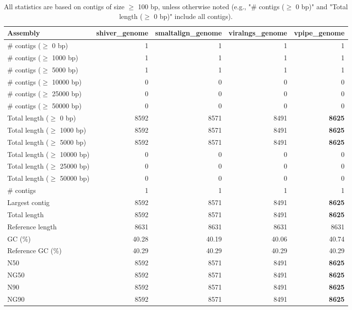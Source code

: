 \documentclass[12pt,a4paper]{article}
\begin{document}
\begin{table}[ht]
\begin{center}
\caption{All statistics are based on contigs of size $\geq$ 100 bp, unless otherwise noted (e.g., "\# contigs ($\geq$ 0 bp)" and "Total length ($\geq$ 0 bp)" include all contigs).}
\begin{tabular}{|l*{4}{|r}|}
\hline
Assembly & shiver\_genome & smaltalign\_genome & viralngs\_genome & vpipe\_genome \\ \hline
\# contigs ($\geq$ 0 bp) & 1 & 1 & 1 & 1 \\ \hline
\# contigs ($\geq$ 1000 bp) & 1 & 1 & 1 & 1 \\ \hline
\# contigs ($\geq$ 5000 bp) & 1 & 1 & 1 & 1 \\ \hline
\# contigs ($\geq$ 10000 bp) & 0 & 0 & 0 & 0 \\ \hline
\# contigs ($\geq$ 25000 bp) & 0 & 0 & 0 & 0 \\ \hline
\# contigs ($\geq$ 50000 bp) & 0 & 0 & 0 & 0 \\ \hline
Total length ($\geq$ 0 bp) & 8592 & 8571 & 8491 & {\bf 8625} \\ \hline
Total length ($\geq$ 1000 bp) & 8592 & 8571 & 8491 & {\bf 8625} \\ \hline
Total length ($\geq$ 5000 bp) & 8592 & 8571 & 8491 & {\bf 8625} \\ \hline
Total length ($\geq$ 10000 bp) & 0 & 0 & 0 & 0 \\ \hline
Total length ($\geq$ 25000 bp) & 0 & 0 & 0 & 0 \\ \hline
Total length ($\geq$ 50000 bp) & 0 & 0 & 0 & 0 \\ \hline
\# contigs & 1 & 1 & 1 & 1 \\ \hline
Largest contig & 8592 & 8571 & 8491 & {\bf 8625} \\ \hline
Total length & 8592 & 8571 & 8491 & {\bf 8625} \\ \hline
Reference length & 8631 & 8631 & 8631 & 8631 \\ \hline
GC (\%) & 40.28 & 40.19 & 40.06 & 40.74 \\ \hline
Reference GC (\%) & 40.29 & 40.29 & 40.29 & 40.29 \\ \hline
N50 & 8592 & 8571 & 8491 & {\bf 8625} \\ \hline
NG50 & 8592 & 8571 & 8491 & {\bf 8625} \\ \hline
N90 & 8592 & 8571 & 8491 & {\bf 8625} \\ \hline
NG90 & 8592 & 8571 & 8491 & {\bf 8625} \\ \hline

\end{tabular}
\end{center}
\end{table}
\end{document}
